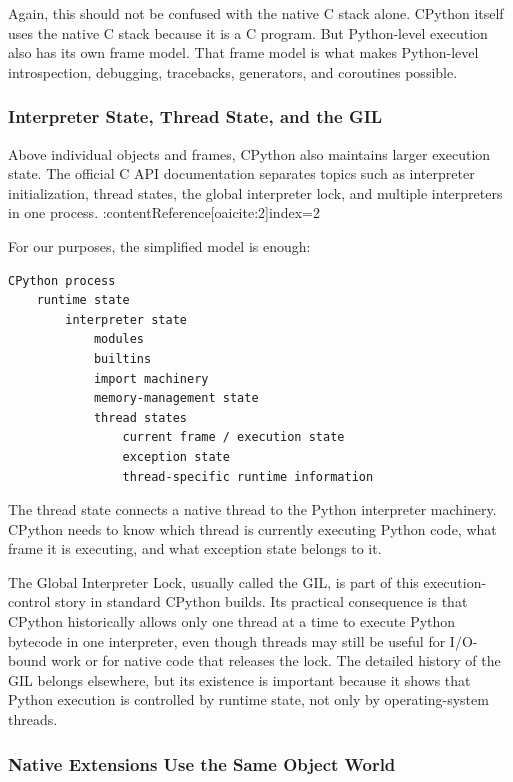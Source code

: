 Again, this should not be confused with the native C stack alone. CPython itself uses the native C stack because it is a C program. But Python-level execution also has its own frame model. That frame model is what makes Python-level introspection, debugging, tracebacks, generators, and coroutines possible.

\subsubsection{Interpreter State, Thread State, and the GIL}

Above individual objects and frames, CPython also maintains larger execution state. The official C API documentation separates topics such as interpreter initialization, thread states, the global interpreter lock, and multiple interpreters in one process. :contentReference[oaicite:2]{index=2}

For our purposes, the simplified model is enough:

\begin{verbatim}
CPython process
    runtime state
        interpreter state
            modules
            builtins
            import machinery
            memory-management state
            thread states
                current frame / execution state
                exception state
                thread-specific runtime information
\end{verbatim}

The thread state connects a native thread to the Python interpreter machinery. CPython needs to know which thread is currently executing Python code, what frame it is executing, and what exception state belongs to it.

The Global Interpreter Lock, usually called the GIL, is part of this execution-control story in standard CPython builds. Its practical consequence is that CPython historically allows only one thread at a time to execute Python bytecode in one interpreter, even though threads may still be useful for I/O-bound work or for native code that releases the lock. The detailed history of the GIL belongs elsewhere, but its existence is important because it shows that Python execution is controlled by runtime state, not only by operating-system threads.

\subsubsection{Native Extensions Use the Same Object World}

